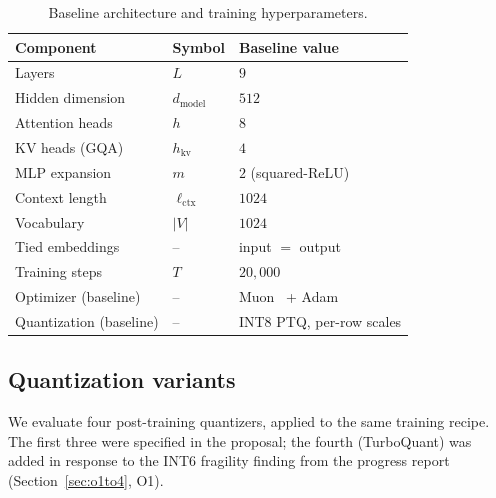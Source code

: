 \documentclass[sigconf,nonacm,natbib=false]{acmart}
\renewcommand{\_}{\discretionary{\char`\_}{}{\char`\_}}
\begin{document}
\begin{table}[t]
\centering
\caption{Baseline architecture and training hyperparameters.}
\label{tab:arch}
\small
\begin{tabular}{@{}lll@{}}
\toprule
Component                 & Symbol               & Baseline value \\
\midrule
Layers                    & $L$                  & $9$ \\
Hidden dimension          & $d_{\text{model}}$   & $512$ \\
Attention heads           & $h$                  & $8$ \\
KV heads (GQA)            & $h_{\text{kv}}$      & $4$ \\
MLP expansion             & $m$                  & $2$ (squared-ReLU) \\
Context length            & $\ell_{\text{ctx}}$  & $1024$ \\
Vocabulary                & $|V|$                & $1024$ \\
Tied embeddings           & --                   & input $=$ output \\
Training steps            & $T$                  & $20{,}000$ \\
Optimizer (baseline)      & --                   & Muon~\cite{muon2024} + Adam \\
Quantization (baseline)   & --                   & INT8 PTQ, per-row scales \\
\bottomrule
\end{tabular}
\end{table}

\subsection{Quantization variants}
\label{sec:setup-quant}

We evaluate four post-training quantizers, applied to the same
training recipe. The first three were specified in the proposal; the
fourth (TurboQuant) was added in response to the INT6 fragility
finding from the progress report (Section~\ref{sec:o1to4}, O1).
\end{document}
